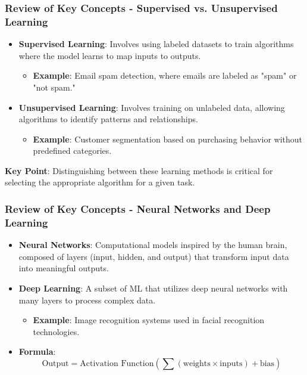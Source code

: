 \documentclass[aspectratio=169]{beamer}
\begin{document}
\begin{frame}[fragile]
    \frametitle{Review of Key Concepts - Supervised vs. Unsupervised Learning}
    \begin{itemize}
        \item \textbf{Supervised Learning}: Involves using labeled datasets to train algorithms where the model learns to map inputs to outputs.
            \begin{itemize}
                \item \textbf{Example}: Email spam detection, where emails are labeled as "spam" or "not spam."
            \end{itemize}
            
        \item \textbf{Unsupervised Learning}: Involves training on unlabeled data, allowing algorithms to identify patterns and relationships.
            \begin{itemize}
                \item \textbf{Example}: Customer segmentation based on purchasing behavior without predefined categories.
            \end{itemize}
    \end{itemize}
    \textbf{Key Point}: Distinguishing between these learning methods is critical for selecting the appropriate algorithm for a given task.
\end{frame}

\begin{frame}[fragile]
    \frametitle{Review of Key Concepts - Neural Networks and Deep Learning}
    \begin{itemize}
        \item \textbf{Neural Networks}: Computational models inspired by the human brain, composed of layers (input, hidden, and output) that transform input data into meaningful outputs.
        
        \item \textbf{Deep Learning}: A subset of ML that utilizes deep neural networks with many layers to process complex data.
            \begin{itemize}
                \item \textbf{Example}: Image recognition systems used in facial recognition technologies.
            \end{itemize}
        
        \item \textbf{Formula}:
        \begin{equation}
            \text{Output} = \text{Activation Function} \left( \sum (\text{weights} \times \text{inputs}) + \text{bias} \right)
        \end{equation}
    \end{itemize}
\end{frame}
\end{document}

